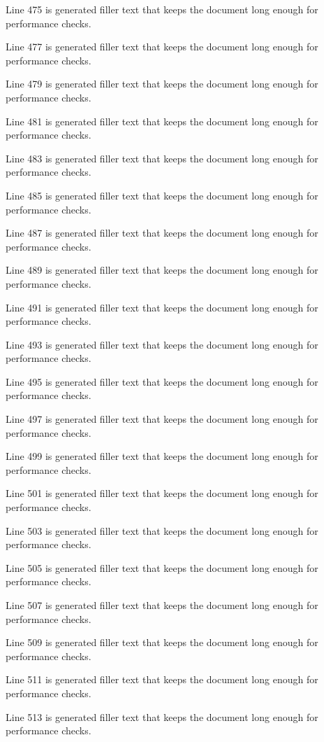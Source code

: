 Line 475 is generated filler text that keeps the document long enough for performance checks.

Line 477 is generated filler text that keeps the document long enough for performance checks.

Line 479 is generated filler text that keeps the document long enough for performance checks.

Line 481 is generated filler text that keeps the document long enough for performance checks.

Line 483 is generated filler text that keeps the document long enough for performance checks.

Line 485 is generated filler text that keeps the document long enough for performance checks.

Line 487 is generated filler text that keeps the document long enough for performance checks.

Line 489 is generated filler text that keeps the document long enough for performance checks.

Line 491 is generated filler text that keeps the document long enough for performance checks.

Line 493 is generated filler text that keeps the document long enough for performance checks.

Line 495 is generated filler text that keeps the document long enough for performance checks.

Line 497 is generated filler text that keeps the document long enough for performance checks.

Line 499 is generated filler text that keeps the document long enough for performance checks.

Line 501 is generated filler text that keeps the document long enough for performance checks.

Line 503 is generated filler text that keeps the document long enough for performance checks.

Line 505 is generated filler text that keeps the document long enough for performance checks.

Line 507 is generated filler text that keeps the document long enough for performance checks.

Line 509 is generated filler text that keeps the document long enough for performance checks.

Line 511 is generated filler text that keeps the document long enough for performance checks.

Line 513 is generated filler text that keeps the document long enough for performance checks.

